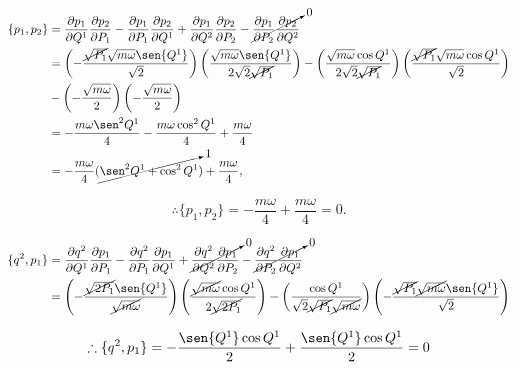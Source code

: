 \documentclass[a4paper,10pt]{article}
\numberwithin{equation}{section}
\begin{document}
\begin{align*}
  \{p_1,p_2\} &= \frac{\partial p_1}{\partial Q^1}\frac{\partial p_2}{\partial P_1} - 
 \frac{\partial p_1}{\partial P_1}\frac{\partial p_2}{\partial Q^1} + 
 \frac{\partial p_1}{\partial Q^2}\frac{\partial p_2}{\partial P_2} -
 \cancelto{0}{\frac{\partial p_1}{\partial P_2}\frac{\partial p_2}{\partial Q^2}} \\
 &= \left(-\frac{\cancel{\sqrt{P_1}}\sqrt{m\omega}\sen{Q^1}}{\sqrt{2}} \right)
 \left(\frac{\sqrt{m\omega}\sen{Q^1}}{2\sqrt{2}\cancel{\sqrt{P_1}}} \right) - 
 \left(\frac{\sqrt{m\omega}\cos{Q^1}}{2\sqrt{2}\cancel{\sqrt{P_1}}} \right) 
 \left(\frac{\cancel{\sqrt{P_1}}\sqrt{m\omega}\cos{Q^1}}{\sqrt{2}} \right) \\
 &- \left(-\frac{\sqrt{m\omega}}{2}\right)\left(-\frac{\sqrt{m\omega}}{2} \right) \\
 &= -\frac{m\omega \sen^2{Q^1}}{4} - \frac{m\omega \cos^2{Q^1}}{4} 
 + \frac{m\omega}{4}\\
 &= - \frac{m\omega}{4}(\cancelto{1}{\sen^2{Q^1} + \cos^2{Q^1}}) + \frac{m\omega}{4},
\end{align*}

\begin{equation}
 \therefore \{p_1,p_2\} = -  \frac{m\omega}{4} +  \frac{m\omega}{4} = 0.
\end{equation}

\begin{align*}
 \{q^2, p_1\} &= \frac{\partial q^2}{\partial Q^1}\frac{\partial p_1}{\partial P_1} - 
 \frac{\partial q^2}{\partial P_1}\frac{\partial p_1}{\partial Q^1} + 
 \cancelto{0}{\frac{\partial q^2}{\partial Q^2}\frac{\partial p_1}{\partial P_2}} -
 \cancelto{0}{\frac{\partial q^2}{\partial P_2}\frac{\partial p_1}{\partial Q^2}} \\
 &= \left(- \frac{\cancel{\sqrt{2P_1}}\sen{Q^1}}{\cancel{\sqrt{m\omega}}} \right)
 \left(\frac{\cancel{\sqrt{m\omega}}\cos{Q^1}}{2\cancel{\sqrt{2P_1}}} \right) - 
 \left(\frac{\cos{Q^1}}{\sqrt{2}\cancel{\sqrt{P_1}}\cancel{\sqrt{m\omega}}} \right)
 \left(- \frac{\cancel{\sqrt{P_1}}\cancel{\sqrt{m\omega}}\sen{Q^1}}{\sqrt{2}} \right)
\end{align*}

\begin{equation}
 \therefore \{q^2, p_1\} = - \frac{\sen{Q^1}\cos{Q^1}}{2} + \frac{\sen{Q^1}\cos{Q^1}}{2} = 0
\end{equation}
\end{document}
